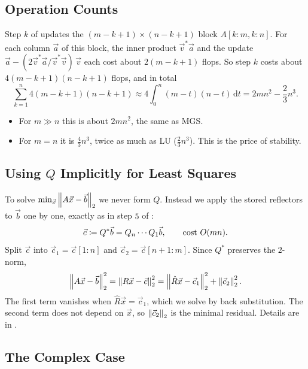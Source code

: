 \subsection{Operation Counts}

Step $k$ of  updates the $(m - k + 1) \times (n - k + 1)$ block $A[k{:}m, k{:}n]$. For each column $\vec{a}$ of this block, the inner product $\vec{v}^\ast\vec{a}$ and the update $\vec{a} - (2\vec{v}^\ast\vec{a}/\vec{v}^\ast\vec{v})\,\vec{v}$ each cost about $2(m - k + 1)$ flops. So step $k$ costs about $4(m - k + 1)(n - k + 1)$ flops, and in total
\begin{equation}
  \sum_{k=1}^{n}4(m - k + 1)(n - k + 1) \approx 4\int_0^n (m - t)(n - t)\,\mathrm{d}t = 2mn^2 - \frac{2}{3}n^3.
\end{equation}
\begin{itemize}
  \item For $m \gg n$ this is about $2mn^2$, the same as MGS.
  \item For $m = n$ it is $\frac{4}{3}n^3$, twice as much as LU ($\frac{2}{3}n^3$). This is the price of stability.
\end{itemize}

\subsection{Using $Q$ Implicitly for Least Squares}

To solve $\min_{\vec{x}}\left\lVert A\vec{x} - \vec{b} \right\rVert_2$ we never form $Q$. Instead we apply the stored reflectors to $\vec{b}$ one by one, exactly as in step $5$ of :
\begin{equation*}
  \vec{c} \coloneqq Q^\ast\vec{b} = Q_n \cdots Q_1\vec{b}, \qquad \text{cost } O(mn).
\end{equation*}
Split $\vec{c}$ into $\vec{c}_1 = \vec{c}[1{:}n]$ and $\vec{c}_2 = \vec{c}[n{+}1{:}m]$. Since $Q^\ast$ preserves the $2$-norm,
\begin{equation*}
  \left\lVert A\vec{x} - \vec{b} \right\rVert_2^2 = \left\lVert R\vec{x} - \vec{c} \right\rVert_2^2 = \left\lVert \hat{R}\vec{x} - \vec{c}_1 \right\rVert_2^2 + \left\lVert \vec{c}_2 \right\rVert_2^2.
\end{equation*}
The first term vanishes when $\hat{R}\vec{x} = \vec{c}_1$, which we solve by back substitution. The second term does not depend on $\vec{x}$, so $\left\lVert \vec{c}_2 \right\rVert_2$ is the minimal residual. Details are in .

\subsection{The Complex Case}

